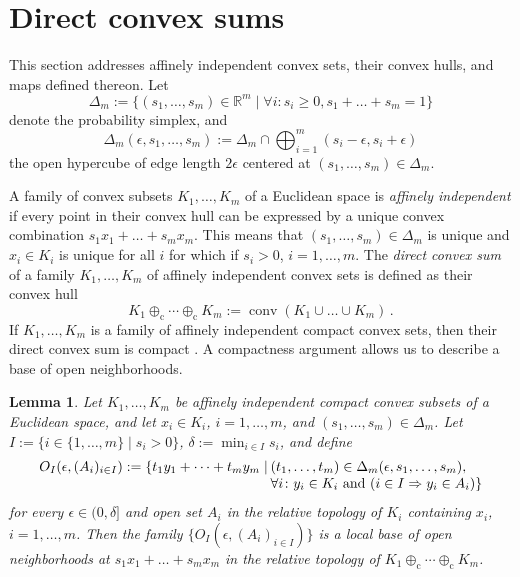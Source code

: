 \documentclass[a4paper,11pt,reqno]{amsart}
\newcommand{\R}{\mathbb{R}}
\newcommand{\dcs}{\oplus_\mathrm{c}}
\DeclareMathOperator\conv{conv}
\newtheorem{lem}[thm]{Lemma}
\theoremstyle{definition}
\theoremstyle{remark}
\numberwithin{equation}{section}
\begin{document}
\section{Direct convex sums}
\label{sec:directsums}
%
This section addresses affinely independent convex sets, their convex hulls,
and maps defined thereon. Let
\[
\Delta_m:=\{(s_1,\dots,s_m)\in\R^m\mid\forall i: s_i\geq0, s_1+\dots+s_m=1\}
\]
denote the probability simplex, and 
\[\textstyle
\Delta_m(\epsilon,s_1,\dots,s_m)
:=\Delta_m\cap\bigoplus_{i=1}^m(s_i-\epsilon,s_i+\epsilon)
\]
the open hypercube of edge length $2\epsilon$ centered at 
$(s_1,\dots,s_m)\in\Delta_m$.
\par
%
A family of convex subsets $K_1,\dots,K_m$ of a Euclidean space is 
\emph{affinely independent} if every point in their convex hull can be 
expressed by a unique convex combination $s_1x_1+\dots+s_mx_m$. This 
means that $(s_1,\dots,s_m)\in\Delta_m$ is unique and $x_i\in K_i$ is 
unique for all $i$ for which if $s_i>0$, $i=1,\dots,m$. The 
\emph{direct convex sum} \cite{Alfsen1971} of a family $K_1,\dots,K_m$ 
of affinely independent convex sets is defined as their convex hull
\[
K_1\dcs\cdots\dcs K_m:=\conv(K_1\cup\dots\cup K_m)\,.
\]
If $K_1,\dots,K_m$ is a family of affinely independent compact convex sets,
then their direct convex sum is compact \cite[Thm.~17.2]{Rockafellar1970}. 
A compactness argument allows us to describe a base of open neighborhoods.
\par
%
\begin{lem}\label{lem:base-dcs}
Let $K_1,\dots,K_m$ be affinely independent compact convex subsets of a 
Euclidean space, and let $x_i\in K_i$, $i=1,\dots,m$, and  
$(s_1,\dots,s_m)\in\Delta_m$. Let $I:=\{i\in\{1,\ldots,m\}\mid s_i>0\}$,
$\delta:=\min_{i\in I}s_i$, and define
\[\begin{array}{r@{\hskip2pt}l}
O_I(\epsilon,(A_i)_{i\in I})
:=\{t_1y_1+\dots+t_my_m\mid &
(t_1,\dots,t_m)\in\Delta_m(\epsilon,s_1,\dots,s_m),\\
  & \mbox{$\forall i\colon y_i\in K_i$ and ($i\in I \Rightarrow y_i\in A_i$)} \}
\end{array}\]
for every $\epsilon\in(0,\delta]$ and open set $A_i$ in the relative 
topology of $K_i$ containing $x_i$, $i=1,\dots,m$. Then the family 
$\{O_I(\epsilon,(A_i)_{i\in I})\}$ is a local base of open neighborhoods at 
$s_1x_1+\dots+s_mx_m$ in the relative topology of $K_1\dcs\cdots\dcs K_m$.
\end{lem}
%
\end{document}
